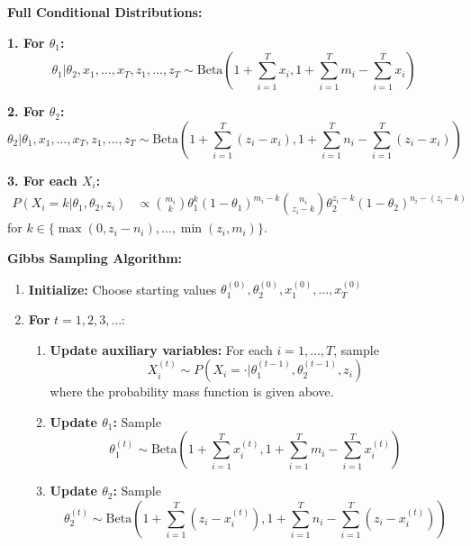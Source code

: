 \textbf{Full Conditional Distributions:}

\textbf{1. For $\theta_1$:}
\begin{equation}
\theta_1 | \theta_2, x_1, \ldots, x_T, z_1, \ldots, z_T \sim \text{Beta}\left(1 + \sum_{i=1}^T x_i, 1 + \sum_{i=1}^T m_i - \sum_{i=1}^T x_i\right)
\end{equation}

\textbf{2. For $\theta_2$:}
\begin{equation}
\theta_2 | \theta_1, x_1, \ldots, x_T, z_1, \ldots, z_T \sim \text{Beta}\left(1 + \sum_{i=1}^T (z_i - x_i), 1 + \sum_{i=1}^T n_i - \sum_{i=1}^T (z_i - x_i)\right)
\end{equation}

\textbf{3. For each $X_i$:}
\begin{align}
P(X_i = k | \theta_1, \theta_2, z_i) &\propto \binom{m_i}{k} \theta_1^k (1-\theta_1)^{m_i-k} \binom{n_i}{z_i-k} \theta_2^{z_i-k} (1-\theta_2)^{n_i-(z_i-k)}
\end{align}
for $k \in \{\max(0, z_i - n_i), \ldots, \min(z_i, m_i)\}$.

\textbf{Gibbs Sampling Algorithm:}

\begin{enumerate}
\item \textbf{Initialize:} Choose starting values $\theta_1^{(0)}, \theta_2^{(0)}, x_1^{(0)}, \ldots, x_T^{(0)}$

\item \textbf{For} $t = 1, 2, 3, \ldots$:

\begin{enumerate}
\item \textbf{Update auxiliary variables:} For each $i = 1, \ldots, T$, sample
\begin{equation}
X_i^{(t)} \sim P(X_i = \cdot | \theta_1^{(t-1)}, \theta_2^{(t-1)}, z_i)
\end{equation}
where the probability mass function is given above.

\item \textbf{Update $\theta_1$:} Sample
\begin{equation}
\theta_1^{(t)} \sim \text{Beta}\left(1 + \sum_{i=1}^T x_i^{(t)}, 1 + \sum_{i=1}^T m_i - \sum_{i=1}^T x_i^{(t)}\right)
\end{equation}

\item \textbf{Update $\theta_2$:} Sample
\begin{equation}
\theta_2^{(t)} \sim \text{Beta}\left(1 + \sum_{i=1}^T (z_i - x_i^{(t)}), 1 + \sum_{i=1}^T n_i - \sum_{i=1}^T (z_i - x_i^{(t)})\right)
\end{equation}
\end{enumerate}
\end{enumerate}


